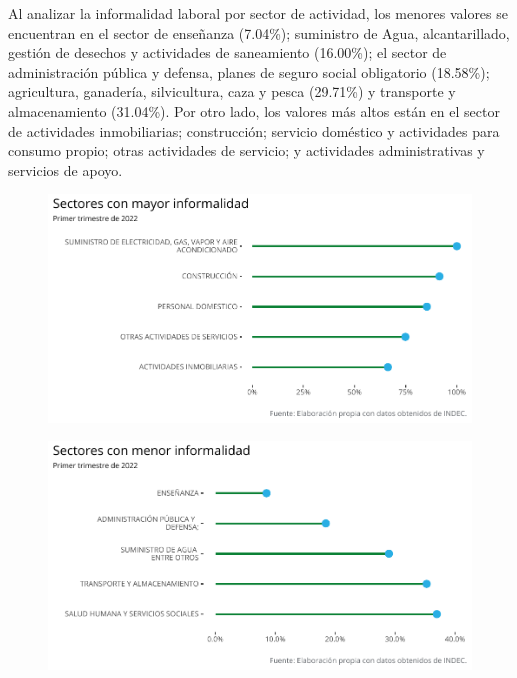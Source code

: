 \documentclass[
]{article}
\begin{document}
\newpage
Al analizar la informalidad laboral por sector de actividad, los menores
valores se encuentran en el sector de enseñanza (7.04\%); suministro de
Agua, alcantarillado, gestión de desechos y actividades de saneamiento
(16.00\%); el sector de administración pública y defensa, planes de
seguro social obligatorio (18.58\%); agricultura, ganadería,
silvicultura, caza y pesca (29.71\%) y transporte y almacenamiento
(31.04\%). Por otro lado, los valores más altos están en el sector de
actividades inmobiliarias; construcción; servicio doméstico y
actividades para consumo propio; otras actividades de servicio; y
actividades administrativas y servicios de apoyo.

\begin{figure}[htp]
\includegraphics{Informe-Mercado-Laboral_files/figure-latex/unnamed-chunk-39-1.pdf}
\caption{}
\end{figure}


\begin{figure}[htp]
\includegraphics{Informe-Mercado-Laboral_files/figure-latex/unnamed-chunk-40-1.pdf}
\caption{}
\end{figure}

\newpage
\end{document}
